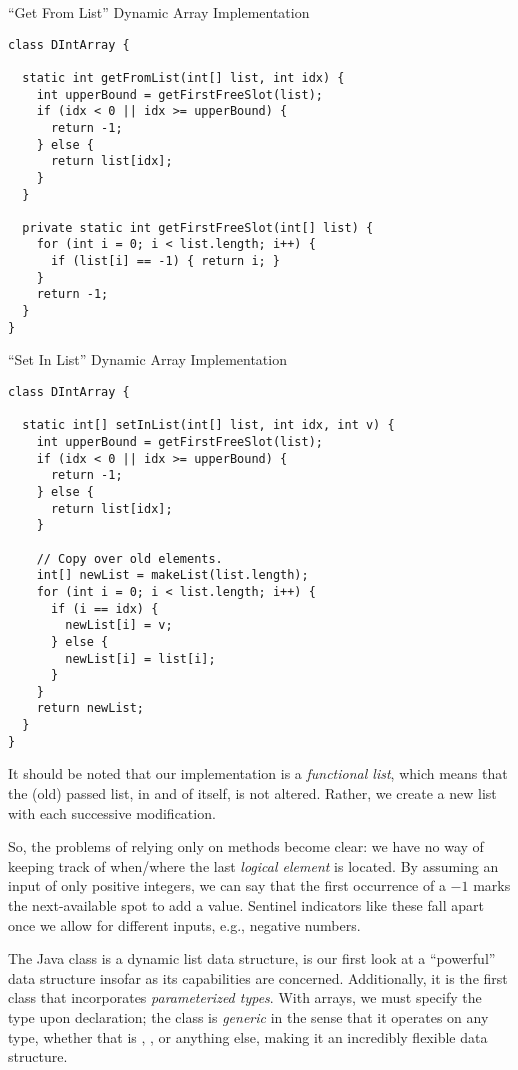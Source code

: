 \begin{cl}[]{``Get From List'' Dynamic Array Implementation}
\begin{lstlisting}[language=MyJava]
class DIntArray {

  static int getFromList(int[] list, int idx) {
    int upperBound = getFirstFreeSlot(list);
    if (idx < 0 || idx >= upperBound) {
      return -1;
    } else {
      return list[idx];
    }
  }

  private static int getFirstFreeSlot(int[] list) {
    for (int i = 0; i < list.length; i++) {
      if (list[i] == -1) { return i; }
    }
    return -1;
  }
}
\end{lstlisting}
\end{cl}

\begin{cl}[]{``Set In List'' Dynamic Array Implementation}
\begin{lstlisting}[language=MyJava]
class DIntArray {

  static int[] setInList(int[] list, int idx, int v) {
    int upperBound = getFirstFreeSlot(list);
    if (idx < 0 || idx >= upperBound) {
      return -1;
    } else {
      return list[idx];
    }

    // Copy over old elements.
    int[] newList = makeList(list.length);
    for (int i = 0; i < list.length; i++) {
      if (i == idx) {
        newList[i] = v;
      } else {
        newList[i] = list[i];
      }
    }
    return newList;
  }
}
\end{lstlisting}
\end{cl}

It should be noted that our implementation is a \emph{functional list}, which means that the (old) passed list, in and of itself, is not altered. Rather, we create a new list with each successive modification.

So, the problems of relying only on methods become clear: we have no way of keeping track of when/where the last \emph{logical element} is located. By assuming an input of only positive integers, we can say that the first occurrence of a $-1$ marks the next-available spot to add a value. Sentinel indicators like these fall apart once we allow for different inputs, e.g., negative numbers. 

The Java  class is a dynamic list data structure, is our first look at a ``powerful'' data structure insofar as its capabilities are concerned. Additionally, it is the first class that incorporates \emph{parameterized types}. With arrays, we must specify the type upon declaration; the  class is \emph{generic} in the sense that it operates on any type, whether that is , , or anything else, making it an incredibly flexible data structure. 

